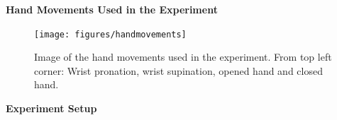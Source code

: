 \textbf{{\Large Hand Movements Used in the Experiment}} \\

\begin{figure}[H]                 
	\texttt{[image: figures/handmovements]}  
	\caption{Image of the hand movements used in the experiment. From top left corner: Wrist pronation, wrist supination, opened hand and closed hand.}
	\label{fig:handmovements} 
\end{figure}

\textbf{{\Large Experiment Setup}}

